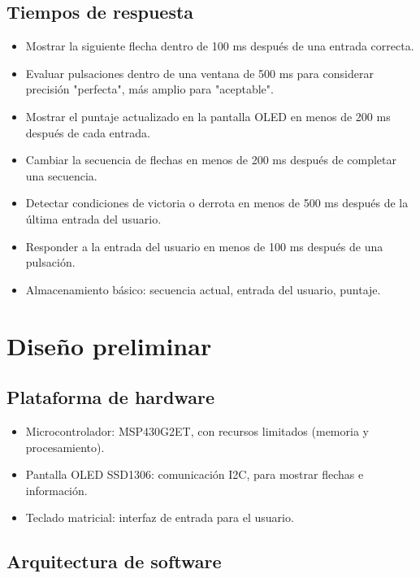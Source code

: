 \documentclass[a4paper,12pt]{article}
\begin{document}
\begin{linenumbers}
      \subsection{Tiempos de respuesta}
      \label{sec:Tiempos de respuesta}   
      \begin{itemize}
        \item Mostrar la siguiente flecha dentro de 100 ms después de una entrada correcta.
        \item Evaluar pulsaciones dentro de una ventana de 500 ms para considerar precisión "perfecta", más amplio para "aceptable".
        \item Mostrar el puntaje actualizado en la pantalla OLED en menos de 200 ms después de cada entrada.
        \item Cambiar la secuencia de flechas en menos de 200 ms después de completar una secuencia.
        \item Detectar condiciones de victoria o derrota en menos de 500 ms después de la última entrada del usuario.
        \item Responder a la entrada del usuario en menos de 100 ms después de una pulsación. 
        \item Almacenamiento básico: secuencia actual, entrada del usuario, puntaje.
      \end{itemize} 
  \section{Diseño preliminar}
  \label{sec:Diseño preliminar}
      \subsection{Plataforma de hardware}
      \label{sec:Plataforma de hardware}
      \begin{itemize}
        \item Microcontrolador: MSP430G2ET, con recursos limitados (memoria y procesamiento).
        \item Pantalla OLED SSD1306: comunicación I2C, para mostrar flechas e información.
        \item Teclado matricial: interfaz de entrada para el usuario.
      \end{itemize}
      \subsection{Arquitectura de software}
      \label{sec:Arquitectura de software}


\end{linenumbers}
\end{document}
